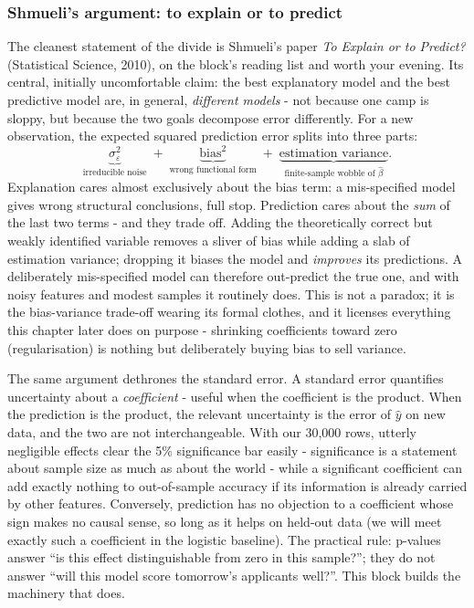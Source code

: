 \documentclass[11pt,a4paper]{article}
\begin{document}
\subsubsection{Shmueli's argument: to explain or to predict}
The cleanest statement of the divide is Shmueli's paper \emph{To Explain
or to Predict?} (Statistical Science, 2010), on the block's reading list
and worth your evening. Its central, initially uncomfortable claim: the
best explanatory model and the best predictive model are, in general,
\emph{different models} - not because one camp is sloppy, but because
the two goals decompose error differently. For a new observation, the
expected squared prediction error splits into three parts:
\[
  \underbrace{\sigma^2_{\varepsilon}}_{\text{irreducible noise}}
  \;+\;
  \underbrace{\text{bias}^2}_{\text{wrong functional form}}
  \;+\;
  \underbrace{\text{estimation variance}}_{\text{finite-sample wobble of }\hat\beta} .
\]
Explanation cares almost exclusively about the bias term: a mis-specified
model gives wrong structural conclusions, full stop. Prediction cares
about the \emph{sum} of the last two terms - and they trade off. Adding
the theoretically correct but weakly identified variable removes a sliver
of bias while adding a slab of estimation variance; dropping it biases
the model and \emph{improves} its predictions. A deliberately
mis-specified model can therefore out-predict the true one, and with
noisy features and modest samples it routinely does. This is not a
paradox; it is the bias-variance trade-off wearing its formal clothes,
and it licenses everything this chapter later does on purpose -
shrinking coefficients toward zero (regularisation) is nothing but
deliberately buying bias to sell variance.

The same argument dethrones the standard error. A standard error
quantifies uncertainty about a \emph{coefficient} - useful when the
coefficient is the product. When the prediction is the product, the
relevant uncertainty is the error of $\hat y$ on new data, and the two
are not interchangeable. With our 30{,}000 rows, utterly negligible
effects clear the 5\% significance bar easily - significance is a
statement about sample size as much as about the world - while a
significant coefficient can add exactly nothing to out-of-sample
accuracy if its information is already carried by other features.
Conversely, prediction has no objection to a coefficient whose sign
makes no causal sense, so long as it helps on held-out data (we will
meet exactly such a coefficient in the logistic baseline). The
practical rule: p-values answer ``is this effect distinguishable from
zero in this sample?''; they do not answer ``will this model score
tomorrow's applicants well?''. This block builds the machinery that
does.
\end{document}
